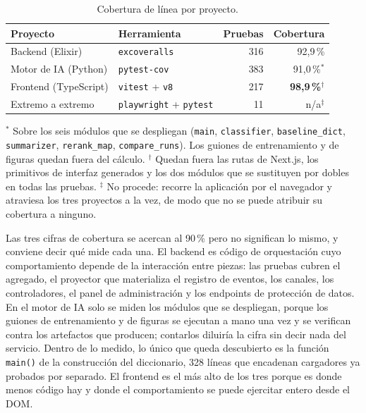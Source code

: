 \begin{table}[h]
\centering
\small
\caption{Cobertura de línea por proyecto.}
\label{tab:cobertura}
\begin{tabular}{llrr}
\hline
\textbf{Proyecto} & \textbf{Herramienta} & \textbf{Pruebas} & \textbf{Cobertura} \\
\hline
Backend (Elixir) & \texttt{excoveralls} & 316 & 92{,}9\,\% \\
Motor de IA (Python) & \texttt{pytest-cov} & 383 & 91{,}0\,\%$^{*}$ \\
Frontend (TypeScript) & \texttt{vitest} + \texttt{v8} & 217 & \textbf{98{,}9\,\%}$^{\dagger}$ \\
Extremo a extremo & \texttt{playwright} + \texttt{pytest} & 11 & n/a$^{\ddagger}$ \\
\hline
\end{tabular}

\vspace{2mm}
{\footnotesize $^{*}$ Sobre los seis módulos que se despliegan (\texttt{main}, \texttt{classifier}, \texttt{baseline\_dict}, \texttt{summarizer}, \texttt{rerank\_map}, \texttt{compare\_runs}). Los guiones de entrenamiento y de figuras quedan fuera del cálculo. $^{\dagger}$ Quedan fuera las rutas de Next.js, los primitivos de interfaz generados y los dos módulos que se sustituyen por dobles en todas las pruebas. $^{\ddagger}$ No procede: recorre la aplicación por el navegador y atraviesa los tres proyectos a la vez, de modo que no se puede atribuir su cobertura a ninguno.}
\end{table}

Las tres cifras de cobertura se acercan al 90\,\% pero no significan lo mismo, y conviene decir qué mide cada una. El backend es código de orquestación cuyo comportamiento depende de la interacción entre piezas: las pruebas cubren el agregado, el proyector que materializa el registro de eventos, los canales, los controladores, el panel de administración y los endpoints de protección de datos. En el motor de IA solo se miden los módulos que se despliegan, porque los guiones de entrenamiento y de figuras se ejecutan a mano una vez y se verifican contra los artefactos que producen; contarlos diluiría la cifra sin decir nada del servicio. Dentro de lo medido, lo único que queda descubierto es la función \texttt{main()} de la construcción del diccionario, 328 líneas que encadenan cargadores ya probados por separado. El frontend es el más alto de los tres porque es donde menos código hay y donde el comportamiento se puede ejercitar entero desde el DOM.

